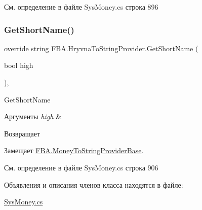 См. определение в файле Sys\+Money.\+cs строка 896

\mbox{\label{class_f_b_a_1_1_hryvna_to_string_provider_a6c6ffa9793f9d6ca8ee4b2fdc401e36a}} 
\subsubsection{\texorpdfstring{Get\+Short\+Name()}{GetShortName()}}
{\footnotesize\ttfamily override string F\+B\+A.\+Hryvna\+To\+String\+Provider.\+Get\+Short\+Name (\begin{DoxyParamCaption}\item[{bool}]{high }\end{DoxyParamCaption})\hspace{0.3cm}{\ttfamily [protected]}, {\ttfamily [virtual]}}



Get\+Short\+Name 


\begin{DoxyParams}{Аргументы}
{\em high} & \\
\hline
\end{DoxyParams}
\begin{DoxyReturn}{Возвращает}

\end{DoxyReturn}


Замещает \mbox{\hyperlink{class_f_b_a_1_1_money_to_string_provider_base_a88f493205be3da3950e2175f1e033595}{F\+B\+A.\+Money\+To\+String\+Provider\+Base}}.



См. определение в файле Sys\+Money.\+cs строка 906



Объявления и описания членов класса находятся в файле\+:\begin{DoxyCompactItemize}
\item 
\mbox{\hyperlink{_sys_money_8cs}{Sys\+Money.\+cs}}\end{DoxyCompactItemize}
